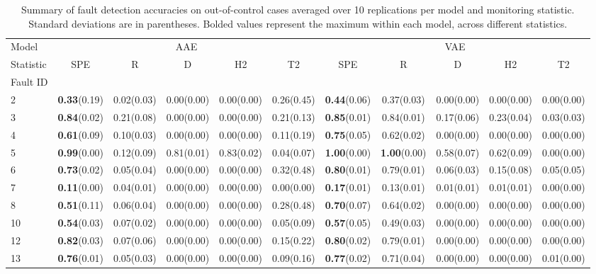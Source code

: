 \documentclass[journal, peerreview]{IEEEtran}
\begin{document}
\begin{table}[t]
\renewcommand{\arraystretch}{1.3}
\caption{Summary of fault detection accuracies on out-of-control cases averaged over 10 replications per model and monitoring statistic. Standard deviations are in parentheses. Bolded values represent the maximum within each model, across different statistics.}
\label{tab:rolling_results}
\centering
\begin{tabular}{lccccc|ccccc}
\toprule
Model & \multicolumn{5}{c}{AAE} & \multicolumn{5}{c}{VAE} \\
Statistic &         SPE &           R &           D &          H2 &          T2 &         SPE &           R &           D &          H2 &          T2 \\
Fault ID &             &             &             &             &             &             &             &             &             &             \\
\midrule
2                &  \textbf{0.33}(0.19) &  0.02(0.03) &  0.00(0.00) &  0.00(0.00) &  0.26(0.45) &  \textbf{0.44}(0.06) &  0.37(0.03) &  0.00(0.00) &  0.00(0.00) &  0.00(0.00) \\
3                &  \textbf{0.84}(0.02) &  0.21(0.08) &  0.00(0.00) &  0.00(0.00) &  0.21(0.13) &  \textbf{0.85}(0.01) &  0.84(0.01) &  0.17(0.06) &  0.23(0.04) &  0.03(0.03) \\
4                &  \textbf{0.61}(0.09) &  0.10(0.03) &  0.00(0.00) &  0.00(0.00) &  0.11(0.19) &  \textbf{0.75}(0.05) &  0.62(0.02) &  0.00(0.00) &  0.00(0.00) &  0.00(0.00) \\
5                &  \textbf{0.99}(0.00) &  0.12(0.09) &  0.81(0.01) &  0.83(0.02) &  0.04(0.07) &  \textbf{1.00}(0.00) &  \textbf{1.00}(0.00) &  0.58(0.07) &  0.62(0.09) &  0.00(0.00) \\
6                &  \textbf{0.73}(0.02) &  0.05(0.04) &  0.00(0.00) &  0.00(0.00) &  0.32(0.48) &  \textbf{0.80}(0.01) &  0.79(0.01) &  0.06(0.03) &  0.15(0.08) &  0.05(0.05) \\
7                &  \textbf{0.11}(0.00) &  0.04(0.01) &  0.00(0.00) &  0.00(0.00) &  0.00(0.00) &  \textbf{0.17}(0.01) &  0.13(0.01) &  0.01(0.01) &  0.01(0.01) &  0.00(0.00) \\
8                &  \textbf{0.51}(0.11) &  0.06(0.04) &  0.00(0.00) &  0.00(0.00) &  0.28(0.48) &  \textbf{0.70}(0.07) &  0.64(0.02) &  0.00(0.00) &  0.00(0.00) &  0.00(0.00) \\
10               &  \textbf{0.54}(0.03) &  0.07(0.02) &  0.00(0.00) &  0.00(0.00) &  0.05(0.09) &  \textbf{0.57}(0.05) &  0.49(0.03) &  0.00(0.00) &  0.00(0.00) &  0.00(0.00) \\
12               &  \textbf{0.82}(0.03) &  0.07(0.06) &  0.00(0.00) &  0.00(0.00) &  0.15(0.22) &  \textbf{0.80}(0.02) &  0.79(0.01) &  0.00(0.00) &  0.00(0.00) &  0.00(0.00) \\
13               &  \textbf{0.76}(0.01) &  0.05(0.03) &  0.00(0.00) &  0.00(0.00) &  0.09(0.16) &  \textbf{0.77}(0.02) &  0.71(0.04) &  0.00(0.00) &  0.00(0.00) &  0.01(0.00) \\
\bottomrule
\end{tabular}
\end{table}
\end{document}
